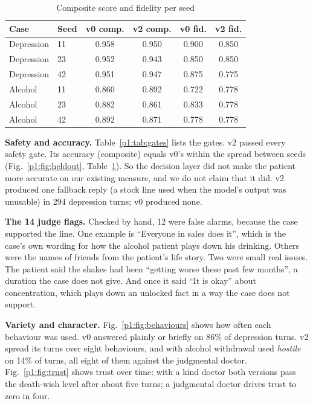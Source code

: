 \documentclass[journal]{IEEEtran}
\begin{document}
\begin{table}[t]
\caption{Composite score and fidelity per seed}
\label{p1:tab:seeds}
\centering
\footnotesize
\begin{tabular}{@{}llcccc@{}}
\toprule
Case & Seed & v0 comp. & v2 comp. & v0 fid. & v2 fid.\\
\midrule
Depression & 11 & 0.958 & 0.950 & 0.900 & 0.850\\
Depression & 23 & 0.952 & 0.943 & 0.850 & 0.850\\
Depression & 42 & 0.951 & 0.947 & 0.875 & 0.775\\
Alcohol & 11 & 0.860 & 0.892 & 0.722 & 0.778\\
Alcohol & 23 & 0.882 & 0.861 & 0.833 & 0.778\\
Alcohol & 42 & 0.892 & 0.871 & 0.778 & 0.778\\
\bottomrule
\end{tabular}
\end{table}

\textbf{Safety and accuracy.} Table~\ref{p1:tab:gates} lists the gates. v2 passed every safety gate. Its accuracy (composite) equals v0's within
the spread between seeds (Fig.~\ref{p1:fig:heldout}, Table~\ref{p1:tab:seeds}). So the decision layer did not make the patient more accurate on our
existing measure, and we do not claim that it did. v2 produced one fallback reply (a stock line used when the model's output was unusable) in 294
depression turns; v0 produced none.

\textbf{The 14 judge flags.} Checked by hand, 12 were false alarms, because the case supported the line. One example is ``Everyone in sales does it'', which is the case's own wording for how the alcohol patient plays down his drinking. Others were the names of friends from the patient's life story. Two were small real issues. The patient said the shakes had been ``getting worse these past few months'', a duration the case does not give. And once it said ``It is okay'' about concentration, which plays down an unlocked fact in a way the case does not support.

\textbf{Variety and character.} Fig.~\ref{p1:fig:behaviours} shows how often each behaviour was used. v0 answered plainly or briefly on 86\% of
depression turns. v2 spread its turns over eight behaviours, and with alcohol withdrawal used \emph{hostile} on 14\% of turns, all eight of them
against the judgmental doctor. Fig.~\ref{p1:fig:trust} shows trust over time: with a kind doctor both versions pass the death-wish level after about
five turns; a judgmental doctor drives trust to zero in four.
\end{document}
